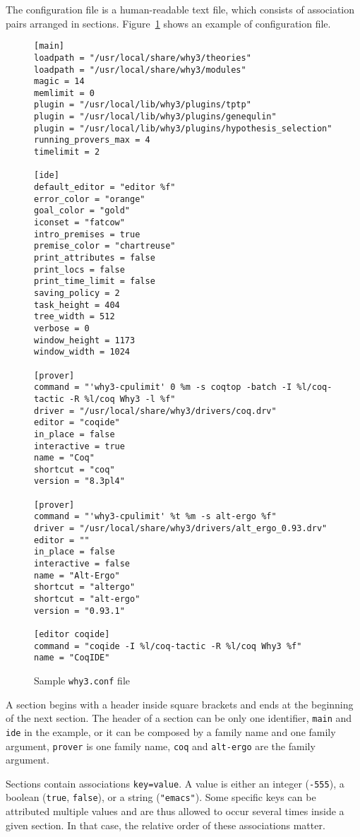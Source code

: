 The configuration file is a human-readable text file, which consists
of association pairs arranged in sections.
Figure~\ref{fig:why3conf} shows an example of configuration file.

\begin{figure}[p]
{\footnotesize
\begin{verbatim}
[main]
loadpath = "/usr/local/share/why3/theories"
loadpath = "/usr/local/share/why3/modules"
magic = 14
memlimit = 0
plugin = "/usr/local/lib/why3/plugins/tptp"
plugin = "/usr/local/lib/why3/plugins/genequlin"
plugin = "/usr/local/lib/why3/plugins/hypothesis_selection"
running_provers_max = 4
timelimit = 2

[ide]
default_editor = "editor %f"
error_color = "orange"
goal_color = "gold"
iconset = "fatcow"
intro_premises = true
premise_color = "chartreuse"
print_attributes = false
print_locs = false
print_time_limit = false
saving_policy = 2
task_height = 404
tree_width = 512
verbose = 0
window_height = 1173
window_width = 1024

[prover]
command = "'why3-cpulimit' 0 %m -s coqtop -batch -I %l/coq-tactic -R %l/coq Why3 -l %f"
driver = "/usr/local/share/why3/drivers/coq.drv"
editor = "coqide"
in_place = false
interactive = true
name = "Coq"
shortcut = "coq"
version = "8.3pl4"

[prover]
command = "'why3-cpulimit' %t %m -s alt-ergo %f"
driver = "/usr/local/share/why3/drivers/alt_ergo_0.93.drv"
editor = ""
in_place = false
interactive = false
name = "Alt-Ergo"
shortcut = "altergo"
shortcut = "alt-ergo"
version = "0.93.1"

[editor coqide]
command = "coqide -I %l/coq-tactic -R %l/coq Why3 %f"
name = "CoqIDE"
\end{verbatim}
}
\caption{Sample \texttt{why3.conf} file}
\label{fig:why3conf}
\end{figure}

A section begins with a header inside square brackets and ends at the
beginning of the next section. The header of a
section can be only one identifier, \texttt{main} and \texttt{ide} in
the example, or it can be composed by a family name and one family
argument, \texttt{prover} is one family name, \texttt{coq} and
\texttt{alt-ergo} are the family argument.

Sections contain associations \texttt{key=value}. A value is either
an integer (\eg \texttt{-555}), a boolean (\texttt{true}, \texttt{false}),
or a string (\eg \texttt{"emacs"}). Some specific keys can be attributed
multiple values and are
thus allowed to occur several times inside a given section. In that
case, the relative order of these associations matter.

